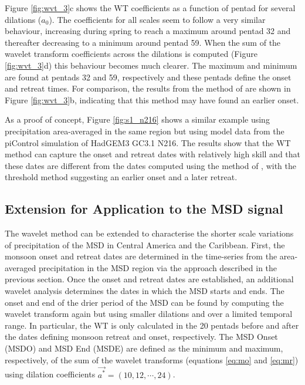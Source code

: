 Figure \ref{fig:wvt_3}c shows the WT coefficients as a function of pentad for several dilations ($a_0$). The coefficients for all scales seem to follow a very similar behaviour, increasing during spring to reach a maximum around pentad 32 and thereafter decreasing to a minimum around pentad 59. When the sum of the wavelet transform coefficients across the dilations is computed (Figure \ref{fig:wvt_3}d) this behaviour becomes much clearer. The maximum and minimum are found at pentads 32 and 59, respectively and these pentads define the onset and retreat times. For comparison, the results from the method of \cite{geil2013} are shown in Figure \ref{fig:wvt_3}b, indicating that this method may have found an earlier onset. 
 
 As a proof of concept, Figure \ref{fig:s1_n216} shows a similar example using precipitation area-averaged in the same region but using model data from the piControl simulation of HadGEM3 GC3.1 N216. 
 The results show that the WT method can capture the onset and retreat dates with relatively high skill and that these dates are different from the dates computed using the method of , with the threshold method suggesting an earlier onset and a later retreat. 

\subsection{Extension for Application to the MSD signal}




The wavelet method can be extended to characterise the shorter scale variations of precipitation of the MSD in Central America and the Caribbean. First, the monsoon onset and retreat dates are determined in the time-series from the area-averaged precipitation in the MSD region via the approach described in the previous section. 
Once the onset and retreat dates are established, an additional wavelet analysis determines the dates in which the MSD starts and ends.
The onset and end of the drier period of the MSD can be found by computing the wavelet transform again but using smaller dilations and over a limited temporal range. In particular, the WT is only calculated in the 20 pentads before and after the dates defining monsoon retreat and onset, respectively. The MSD Onset (MSDO) and MSD End (MSDE) are defined as the minimum and maximum, respectively, of the sum of the wavelet transforms (equations \ref{eq:mo} and \ref{eq:mr}) using dilation coefficients $\vec{a^*} = (10,12,\cdots, 24)$.


